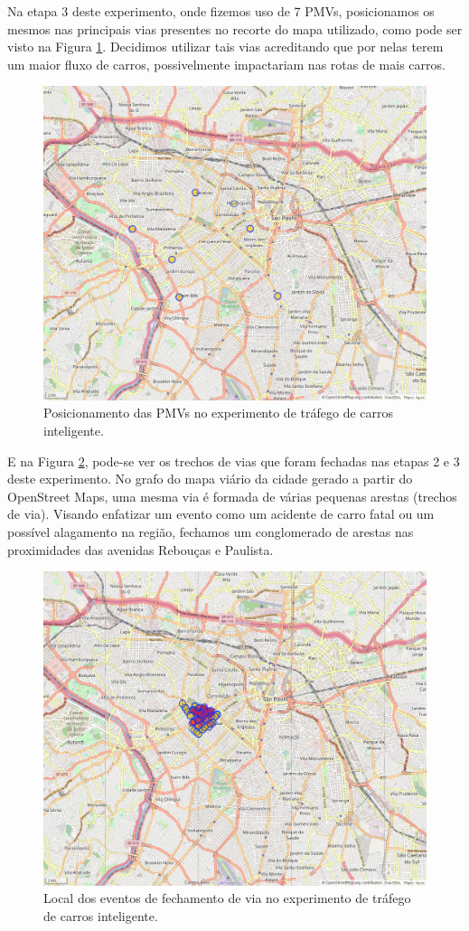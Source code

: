 Na etapa 3 deste experimento, onde fizemos uso de 7 PMVs, posicionamos os mesmos nas principais vias presentes no recorte do mapa utilizado, como pode ser visto na Figura \ref{fig:pos_pmvs}.
Decidimos utilizar tais vias acreditando que por nelas terem um maior fluxo de carros, possivelmente impactariam nas rotas de mais carros.

\begin{figure}[ht]
	\centering
	\includegraphics[width=.7\textwidth]{figuras/pmvs_locations.png}
	\caption{Posicionamento das PMVs no experimento de tráfego de carros inteligente.}
	\label{fig:pos_pmvs}
\end{figure}

E na Figura \ref{fig:eventos}, pode-se ver os trechos de vias que foram fechadas nas etapas 2 e 3 deste experimento.
No grafo do mapa viário da cidade gerado a partir do OpenStreet Maps, uma mesma via é formada de várias pequenas arestas (trechos de via).
Visando enfatizar um evento como um acidente de carro fatal ou um possível alagamento na região, fechamos um conglomerado de arestas nas proximidades das avenidas Rebouças e Paulista.

\begin{figure}[ht]
	\centering
	\includegraphics[width=.7\textwidth]{figuras/events_edges_map.png}
	\caption{Local dos eventos de fechamento de via no experimento de tráfego de carros inteligente.}
	\label{fig:eventos}
\end{figure}

